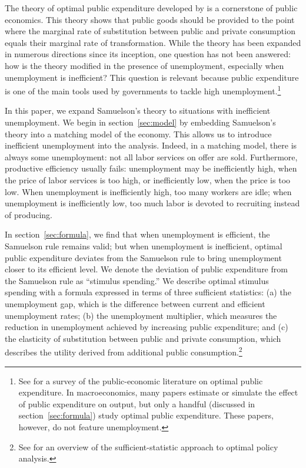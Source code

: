 \documentclass[letterpaper,12pt,leqno]{article}
\begin{document}
\begin{bibunit}
The theory of optimal public expenditure developed by  is a cornerstone of public economics. This theory shows that public goods should be provided to the point where the marginal rate of substitution between public and private consumption equals their marginal rate of transformation. While the theory has been expanded in numerous directions since its inception, one question has not been answered: how is the theory modified in the presence of unemployment, especially when unemployment is inefficient? This question is relevant because public expenditure is one of the main tools used by governments to tackle high unemployment.\footnote{See  for a survey of the public-economic literature on optimal public expenditure. In macroeconomics, many papers estimate or simulate the effect of public expenditure on output, but only a handful (discussed in section~\ref{sec:formula}) study optimal public expenditure. These papers, however, do not feature unemployment.}

In this paper, we expand Samuelson's theory to situations with inefficient unemployment. We begin in section~\ref{sec:model} by embedding Samuelson's theory into a matching model of the economy. This allows us to introduce inefficient unemployment into the analysis. Indeed, in a matching model, there is always some unemployment: not all labor services on offer are sold. Furthermore, productive efficiency usually fails: unemployment may be inefficiently high, when the price of labor services is too high, or inefficiently low, when the price is too low. When unemployment is inefficiently high, too many workers are idle; when unemployment is inefficiently low, too much labor is devoted to recruiting instead of producing.

In section~\ref{sec:formula}, we find that when unemployment is efficient, the Samuelson rule remains valid; but when unemployment is inefficient, optimal public expenditure deviates from the Samuelson rule to bring unemployment closer to its efficient level. We denote the deviation of public expenditure from the Samuelson rule as ``stimulus spending.'' We describe optimal stimulus spending with a formula expressed in terms of three sufficient statistics: (a) the unemployment gap, which is the difference between current and efficient unemployment rates; (b) the unemployment multiplier, which measures the reduction in unemployment achieved by increasing public expenditure; and (c) the elasticity of substitution between public and private consumption, which describes the utility derived from additional public consumption.\footnote{See  for an overview of the sufficient-statistic approach to optimal policy analysis.}


\end{bibunit}
\end{document}

